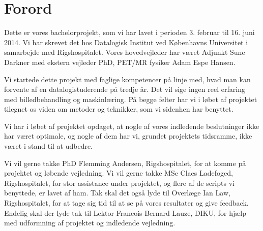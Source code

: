 \section{Forord}

Dette er vores bachelorprojekt, som vi har lavet i perioden 3.
februar til 16. juni 2014. Vi har skrevet det hos Datalogisk Institut
ved Københavns Universitet i samarbejde med Rigshospitalet. Vores
hovedvejleder har været Adjunkt Sune Darkner med ekstern vejleder PhD,
PET/MR fysiker Adam Espe Hansen.

Vi startede dette projekt med faglige kompetencer på linje med, hvad
man kan forvente af en datalogistuderende på tredje år. Det vil sige
ingen reel erfaring med billedbehandling og maskinlæring. På begge
felter har vi i løbet af projektet tilegnet os viden om metoder og
teknikker, som vi sidenhen har benyttet.

Vi har i løbet af projektet opdaget, at nogle af vores indledende
beslutninger ikke har været optimale, og nogle af dem har vi, grundet
projektets tidsramme, ikke været i stand til at udbedre.

Vi vil gerne takke PhD Flemming Andersen, Rigshospitalet, for at komme på
projektet og løbende vejledning. Vi vil gerne takke MSc Claes Ladefoged,
Rigshospitalet, for stor assistance under projektet, og flere af de
scripts vi benyttede, er lavet af ham. Tak skal det også lyde til Overlæge
Ian Law, Rigshospitalet, for at tage sig tid til at se på vores resultater
og give feedback.
Endelig skal der lyde tak til Lektor Francois Bernard Lauze, DIKU, for
hjælp med udformning af projektet og indledende vejledning.


